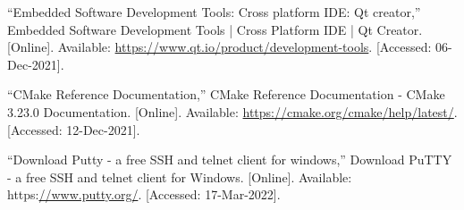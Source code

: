 \documentclass[a4paper, 12pt, oneside, BCOR1cm,toc=chapterentrywithdots]{scrbook}
\begin{document}
\begin{thebibliography}{00}
“Embedded Software Development Tools: Cross platform IDE: Qt creator,” Embedded Software Development Tools | Cross Platform IDE | Qt Creator. [Online]. Available: \url{https://www.qt.io/product/development-tools}. [Accessed: 06-Dec-2021]. 

“CMake Reference Documentation,” CMake Reference Documentation - CMake 3.23.0 Documentation. [Online]. Available: \url{https://cmake.org/cmake/help/latest/}. [Accessed: 12-Dec-2021]. 

“Download Putty - a free SSH and telnet client for windows,” Download PuTTY - a free SSH and telnet client for Windows. [Online]. Available: https:\url{//www.putty.org/}. [Accessed: 17-Mar-2022]. 

\end{thebibliography}
\end{document}
